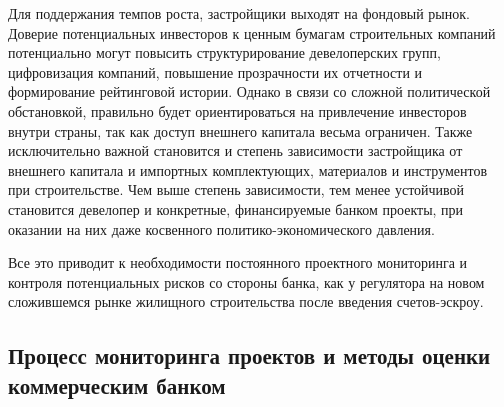 \documentclass[12pt,a4paper]{article} %
\begin{document}
Для поддержания темпов роста, застройщики выходят на фондовый рынок. Доверие потенциальных инвесторов к ценным бумагам строительных компаний потенциально могут повысить структурирование девелоперских групп,  цифровизация компаний, повышение прозрачности их отчетности и формирование рейтинговой истории. Однако в связи со сложной политической обстановкой, правильно будет ориентироваться на привлечение  инвесторов внутри страны, так как доступ внешнего капитала весьма ограничен. Также исключительно важной становится и степень зависимости застройщика от внешнего капитала и импортных комплектующих, материалов и инструментов при строительстве. Чем выше степень зависимости, тем менее устойчивой становится девелопер и конкретные, финансируемые банком проекты, при оказании на них даже косвенного политико-экономического давления.

Все это приводит к необходимости постоянного проектного мониторинга и контроля потенциальных рисков со стороны банка, как у регулятора на новом сложившемся рынке жилищного строительства после введения счетов-эскроу.
  

\subsection{Процесс мониторинга проектов и методы оценки коммерческим банком}
\end{document}
